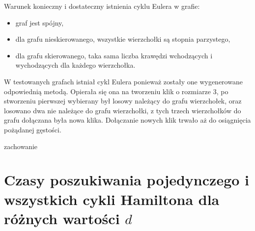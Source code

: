 \documentclass[polish,polish,a4paper]{article}
\begin{document}
\begin{spacing}{1.25}
Warunek konieczny i dostateczny istnienia cyklu Eulera w grafie:
\begin{spacing}{0.5}
	\begin{itemize}
		\item graf jest spójny,
		\item dla grafu nieskierowanego, wszystkie wierzchołki są stopnia parzystego,
		\item dla grafu skierowanego, taka sama liczba krawędzi wchodzących i wychodzących dla każdego wierzchołka.
	\end{itemize}
\end{spacing}

W testowanych grafach istniał cykl Eulera ponieważ zostały one wygenerowane odpowiednią metodą.
Opierała się ona na tworzeniu klik o rozmiarze 3, po stworzeniu pierwszej wybierany był losowy należący do grafu wierzchołek, oraz losowano dwa nie należące do grafu wierzchołki, z tych trzech wierzchołków do grafu dołączana była nowa klika. Dołączanie nowych klik trwało aż do osiągnięcia pożądanej gęstości.

{\huge zachowanie}




\section{Czasy poszukiwania pojedynczego i wszystkich cykli Hamiltona dla różnych wartości $d$}



\end{spacing}
\end{document}
